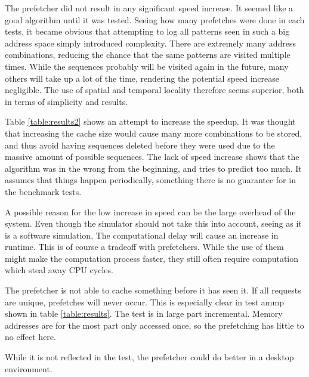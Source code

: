 The prefetcher did not result in any significant speed increase. It seemed like a good algorithm until it was tested. Seeing how many prefetches were done in each tests, it became obvious that attempting to log all patterns seen in such a big address space simply introduced complexity. There are extremely many address combinations, reducing the chance that the same patterns are visited multiple times. While the sequences probably will be visited again in the future, many others will take up a lot of the time, rendering the potential speed increase negligible. The use of spatial and temporal locality therefore seems superior, both in terms of simplicity and results.

Table \ref{table:results2} shows an attempt to increase the speedup. It was thought that increasing the cache size would cause many more combinations to be stored, and thus avoid having sequences deleted before they were used due to the massive amount of possible sequences. The lack of speed increase shows that the algorithm was in the wrong from the beginning, and tries to predict too much. It assumes that things happen periodically, something there is no guarantee for in the benchmark tests. 

A possible reason for the low increase in speed can be the large overhead of the system. Even though the simulator should not take this into account, seeing as it is a software simulation, The computational delay will cause an increase in runtime. This is of course a tradeoff with prefetchers. While the use of them might make the computation process faster, they still often require computation which steal away CPU cycles.

The prefetcher is not able to cache something before it has seen it. If all requests are unique, prefetches will never occur. This is especially clear in test ammp shown in table \ref{table:results}. The test is in large part incremental. Memory addresses are for the most part only accessed once, so the prefetching has little to no effect here.

While it is not reflected in the test, the prefetcher could do better in a desktop environment. 

%
%
%
